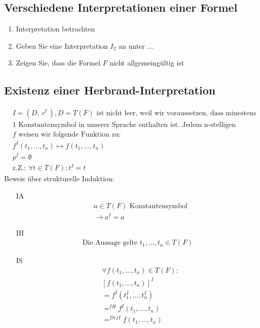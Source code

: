 \subsection{Verschiedene Interpretationen einer Formel}
\begin{enumerate}
	\item Interpretation betrachten
	\item Geben Sie eine Interpretation \(I_2\) an unter ...
	\item Zeigen Sie, dass die Formel \(F\) nicht allgemeingültig ist
\end{enumerate}
\subsection{Existenz einer Herbrand-Interpretation}
\begin{align*}
	&I = (D, \circ^I), D = T(F) \text{ ist nicht leer, weil wir voraussetzen, dass minestens }\\ &\text{1 Konstantensymbol in unserer Sprache enthalten ist. Jedem n-stelligen Funktionssymbol}\\ &f \text{ weisen wir folgende Funktion zu:}\\
	&f^I(t_1, \ldots, t_n) \mapsto f(t_1, \ldots, t_n) \\
	&p^I = \emptyset \\
	&\text{z.Z.: }\forall t \in T(F): t^I = t
\end{align*}
Beweis über strukturelle Induktion:
\begin{itemize}
	\item[IA]
	\begin{align*}
		&a \in T(F) \text{ Konstantensymbol} \\
		&\to a^I = a
	\end{align*}
	\item[IH]
	\begin{align*}
		\text{Die Aussage gelte } t_1,\ldots, t_n \in T(F)
	\end{align*}
	\item[IS]
	\begin{align*}
		&\forall f(t_1, \ldots, t_n) \in T(F): \\
		&[f(t_1, \ldots,t_n)]^I \\
		&= f^I(t_1^I,\ldots, t_n^I) \\
		&=^{IH} f^I(t_1, \ldots, t_n) \\
		&=^{Def I} f(t_1,\ldots , t_n)
	\end{align*}
\end{itemize}